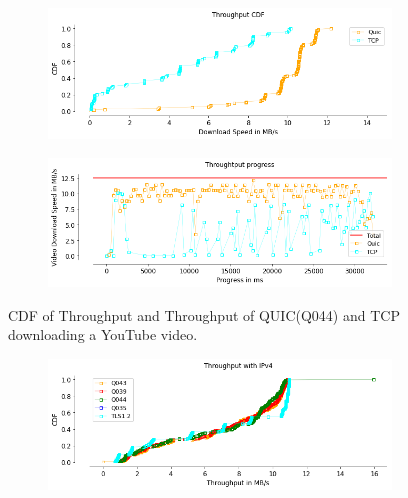 \begin{frame}

\begin{figure}[!htb]
    \begin{subfigure}{0.45\textwidth}
        \includegraphics[width=\linewidth]{./plots/youtube/throughput/ThroughputCDF.png}
    \end{subfigure}   
    \begin{subfigure}{0.45\textwidth}
        \includegraphics[width=\linewidth]{./plots/youtube/throughput/Throughtputprogress.png}
    \end{subfigure}  
    \caption{CDF of Throughput and Throughput of QUIC(Q044) and TCP downloading a YouTube video.}\label{fig:throughput-of-quic-q044-}
\end{figure}
%
\begin{figure}[!htb]
    \begin{subfigure}{0.45\textwidth}
        \includegraphics[width=\linewidth]{./plots/PI/gdrive/Throughput_ipv4.png}

\end{subfigure}
\end{figure}
\end{frame}
